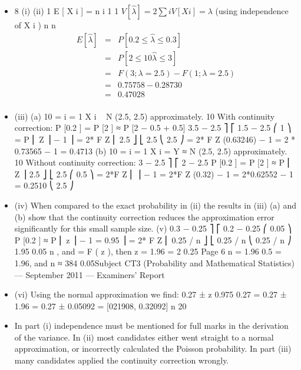 \documentclass[a4paper,12pt]{article}
\begin{document}
\begin{itemize}
    \item 8
(i)
(ii)
1
\sum E [ X i ] = \lambda
n i
1
1
$V [ \hat{\lambda} ] = 2 \sum i V [ X i ] = \lambda$ (using independence of X i )
n
n
\begin{eqnarray*}
E [ \hat{\lambda} ] &=& P [0.2 \leq \hat{\lambda} \leq 0.3] \\ 
&=& P [2 \leq 10 \hat{\lambda} \leq 3]\\
&=& F(3; \lambda = 2.5) − F(1; \lambda = 2.5)\\ &=& 0.75758 − 0.28730 \\ &=& 0.47028 \\
\end{eqnarray*}


\item (iii)
(a)
10 \hat{\lambda} = \sum i = 1 X i ~ N (2.5, 2.5) approximately.
10
With continuity correction:
P [0.2 \leq \hat{\lambda} ] = P [2  \hat{\lambda} ] ≈ P [2 − 0.5  \hat{\lambda}  + 0.5]
3.5 − 2.5 ⎤
⎡ 1.5 − 2.5
⎛ 1 ⎞
= P ⎢
\leq Z \leq
⎟ − 1
⎥ = 2* F Z ⎜
2.5 ⎦
⎣ 2.5
⎝ 2.5 ⎠
= 2* F Z (0.63246) − 1 = 2 * 0.73565 − 1 = 0.4713
(b)
10 \hat{\lambda} = \sum i = 1 X i = Y ≈ N (2.5, 2.5) approximately.
10
Without continuity correction:
3 − 2.5 ⎤
⎡ 2 − 2.5
P [0.2 \leq \hat{\lambda} ] = P [2  \hat{\lambda} ] ≈ P ⎢
\leq Z \leq
⎥
2.5 ⎦
⎣ 2.5
⎛ 0.5 ⎞
= 2*F Z ⎜
⎟ − 1 = 2*F Z (0.32) − 1 = 2*0.62552 − 1 = 0.2510
⎝ 2.5 ⎠
\item (iv)
When compared to the exact probability in (ii) the results in (iii) (a) and (b)
show that the continuity correction reduces the approximation error
significantly for this small sample size.
(v)
0.3 − 0.25 ⎤
⎡ 0.2 − 0.25
⎛ 0.05 ⎞
P [0.2 \leq \hat{\lambda} ] ≈ P ⎢
\leq z \leq
⎟ − 1 = 0.95
⎥ = 2* F Z ⎜
0.25 / n ⎦
⎣ 0.25 / n
⎝ 0.25 / n ⎠
1.95
0.05
n , and
= F ( z ), then z = 1.96 =
2
0.25
Page 6
n = 1.96
0.5
= 1.96, and n ≈ 384
0.05Subject CT3 (Probability and Mathematical Statistics) — September 2011 — Examiners’ Report
\item (vi)
Using the normal approximation we find:
0.27 ± z 0.975
\hat{\lambda}
0.27
= 0.27 ± 1.96
= 0.27 ± 0.05092 = [021908, 0.32092]
n
20
\item In part (i) independence must be mentioned for full marks in the derivation of the variance. In
(ii) most candidates either went straight to a normal approximation, or incorrectly calculated
the Poisson probability. In part (iii) many candidates applied the continuity correction
wrongly.
\end{itemize}
\end{document}
